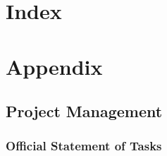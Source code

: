 \documentclass[10pt,a4paper,titlepage,twoside,english,final]{zhawreprt}
\begin{document}
%


\chapter{Index}\label{chp:Index}
\label{sec:Bibliography}
\newpage
\printglossary\label{sec:Glossary}
\newpage
\listoffigures\label{sec:ListOfFigures}
\newpage
\lstlistoflistings\label{sec:ListOfListings}
\newpage
\printglossary[title=SymbolGlossary,type=symbols]\label{sec:SymbolGlossary}
\newpage
\printglossary[title=Acronym Glossary,type=\acronymtype]\label{sec:AcronymGlossary}
\newpage
\printindex\label{sec:Index}

\appendix
\chapter{Appendix}\label{chp:Appendix}
\section{Project Management}\label{sec:ProjectManagement}

\subsection{Official Statement of Tasks}\label{ssec:OfficialStatementOfTasks}

\end{document}

